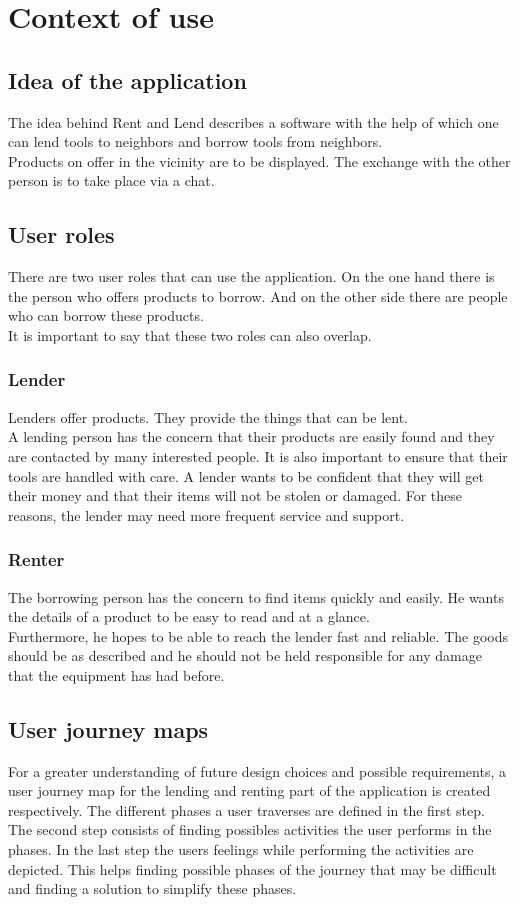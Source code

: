\clearpage
\section{Context of use}
\subsection{Idea of the application}
The idea behind Rent and Lend describes a software with the help of which one can lend tools to neighbors and borrow tools from neighbors.\\
Products on offer in the vicinity are to be displayed. The exchange with the other person is to take place via a chat. 
\subsection{User roles}
There are two user roles that can use the application. On the one hand there is the person who offers products to borrow. And on the other side there are people who can borrow these products.\\
It is important to say that these two roles can also overlap. 
\subsubsection{Lender}
Lenders offer products. They provide the things that can be lent. \\
A lending person has the concern that their products are easily found and they are contacted by many interested people. It is also important to ensure that their tools are handled with care. A lender wants to be confident that they will get their money and that their items will not be stolen or damaged. For these reasons, the lender may need more frequent service and support.
\subsubsection{Renter}
The borrowing person has the concern to find items quickly and easily. He wants the details of a product to be easy to read and at a glance.\\
 Furthermore, he hopes to be able to reach the lender fast and reliable. The goods should be as described and he should not be held responsible for any damage that the equipment has had before.

\subsection{User journey maps}
		For a greater understanding of future design choices and possible requirements, a user journey map for the lending and renting part of the application is created respectively. The different phases a user traverses are defined in the first step. The second step consists of finding possibles activities the user performs in the phases. In the last step the users feelings while performing the activities are depicted. This helps finding possible phases of the journey that may be difficult and finding a solution to simplify these phases.\\
		
